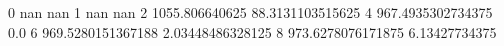 0 nan nan
1 nan nan
2 1055.806640625 88.3131103515625
4 967.4935302734375 0.0
6 969.5280151367188 2.03448486328125
8 973.6278076171875 6.13427734375
